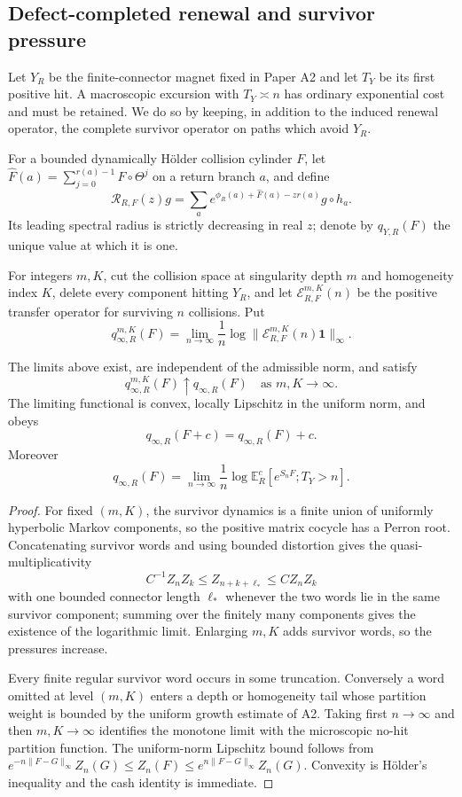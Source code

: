 \subsection{Defect-completed renewal and survivor pressure}

Let \(Y_R\) be the finite-connector magnet fixed in Paper A2 and let
\(T_Y\) be its first positive hit.  A macroscopic excursion with
\(T_Y\asymp n\) has ordinary exponential cost and must be retained.  We do so
by keeping, in addition to the induced renewal operator, the complete survivor
operator on paths which avoid \(Y_R\).

For a bounded dynamically H\"older collision cylinder \(F\), let
\(\widehat F(a)=\sum_{j=0}^{r(a)-1}F\circ\Theta^j\) on a return branch
\(a\), and define
\[
 \mathscr R_{R,F}(z)g
 =\sum_{a}e^{\widehat\phi_R(a)+\widehat F(a)-zr(a)}g\circ h_a.
\]
Its leading spectral radius is strictly decreasing in real \(z\); denote by
\(q_{Y,R}(F)\) the unique value at which it is one.

For integers \(m,K\), cut the collision space at singularity depth \(m\) and
homogeneity index \(K\), delete every component hitting \(Y_R\), and let
\(\mathscr E_{R,F}^{m,K}(n)\) be the positive transfer operator for surviving
\(n\) collisions.  Put
\[
 q_{\infty,R}^{m,K}(F)
 =\lim_{n\to\infty}\frac1n
 \log\|\mathscr E_{R,F}^{m,K}(n)\mathbf1\|_\infty.
\]

\begin{lemma}
\label{lem:r4-a3-survivor}
The limits above exist, are independent of the admissible norm, and satisfy
\[
 q_{\infty,R}^{m,K}(F)\uparrow q_{\infty,R}(F)
 \quad\text{as }m,K\to\infty.
\]
The limiting functional is convex, locally Lipschitz in the uniform norm, and
obeys
\[
 q_{\infty,R}(F+c)=q_{\infty,R}(F)+c.
\]
Moreover
\[
 q_{\infty,R}(F)
 =\lim_{n\to\infty}\frac1n
 \log\mathbb E_R^c
 \left[e^{S_nF};T_Y>n\right].
\]

\end{lemma}

\begin{proof}
For fixed \((m,K)\), the survivor dynamics is a finite union of uniformly
hyperbolic Markov components, so the positive matrix cocycle has a Perron
root.  Concatenating survivor words and using bounded distortion gives the
quasi-multiplicativity
\[
 C^{-1}Z_nZ_k\le Z_{n+k+\ell_*}\le CZ_nZ_k
\]
with one bounded connector length \(\ell_*\) whenever the two words lie in the
same survivor component; summing over the finitely many components gives the
existence of the logarithmic limit.  Enlarging \(m,K\) adds survivor words,
so the pressures increase.

Every finite regular survivor word occurs in some truncation.  Conversely a
word omitted at level \((m,K)\) enters a depth or homogeneity tail whose
partition weight is bounded by the uniform growth estimate of A2.  Taking
first \(n\to\infty\) and then \(m,K\to\infty\) identifies the monotone limit
with the microscopic no-hit partition function.  The uniform-norm Lipschitz
bound follows from
\(e^{-n\|F-G\|_\infty}Z_n(G)\le Z_n(F)\le
 e^{n\|F-G\|_\infty}Z_n(G)\).  Convexity is H\"older's inequality and the
cash identity is immediate.
\end{proof}

